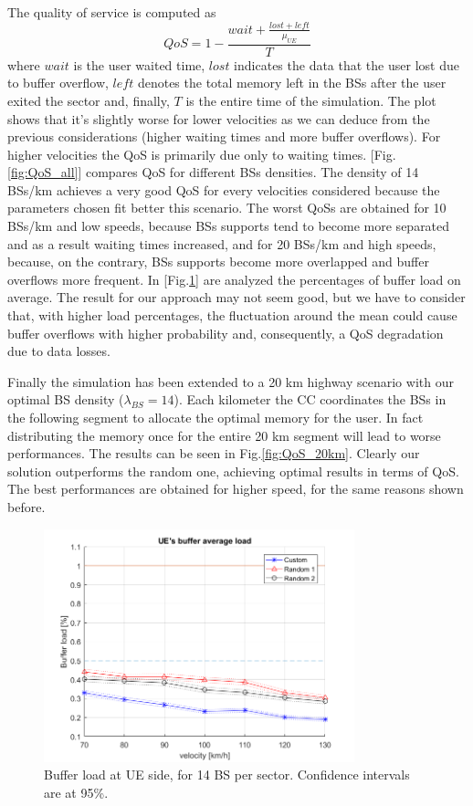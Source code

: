 \documentclass[conference,10pt]{IEEEtran}
\begin{document}
The quality of service is computed as
\begin{equation}
QoS = 1-\frac{wait+\frac{lost+left}{\mu_{U\!E}}}{T}
\end{equation} 
where $wait$ is the user waited time, $lost$ indicates the data that the user lost due to buffer overflow, $left$ denotes the total memory left in the BSs after the user exited the sector and, finally, $T$ is the entire time of the simulation. The plot shows that it's slightly worse for lower velocities as we can deduce from the previous considerations (higher waiting times and more buffer overflows). For higher velocities the QoS is primarily due only to waiting times. [Fig.\ref{fig:QoS_all}] compares QoS for different BSs densities. The density of 14 BSs/km achieves a very good QoS for every velocities considered because the parameters chosen fit better this scenario. The worst QoSs are obtained for 10 BSs/km and low speeds, because BSs supports tend to become more separated and as a result waiting times increased, and for 20 BSs/km and high speeds, because, on the contrary, BSs supports become more overlapped and buffer overflows more frequent. 
In [Fig.\ref{fig:7BS_buffer_load}] are analyzed the percentages of buffer load on average. The result for our approach may not seem good, but we have to consider that, with higher load percentages, the fluctuation around the mean could cause buffer overflows with higher probability and, consequently, a QoS degradation due to data losses.

Finally the simulation has been extended to a 20 km highway scenario with our optimal BS density ($\lambda_{BS}=14$). Each kilometer the CC coordinates the BSs in the following segment to allocate the optimal memory for the user. In fact distributing the memory once for the entire 20 km segment will lead to worse performances. The results can be seen in Fig.\ref{fig:QoS_20km}. Clearly our solution outperforms the random one, achieving optimal results in terms of QoS. The best performances are obtained for higher speed, for the same reasons shown before.







\begin{figure}[t]
	\centering
	\includegraphics[width=9cm]{UE_buffer.png}
	\caption{Buffer load at UE side, for 14 BS per sector. Confidence intervals are at 95\%.}
	\label{fig:7BS_buffer_load}
\end{figure}
\end{document}

